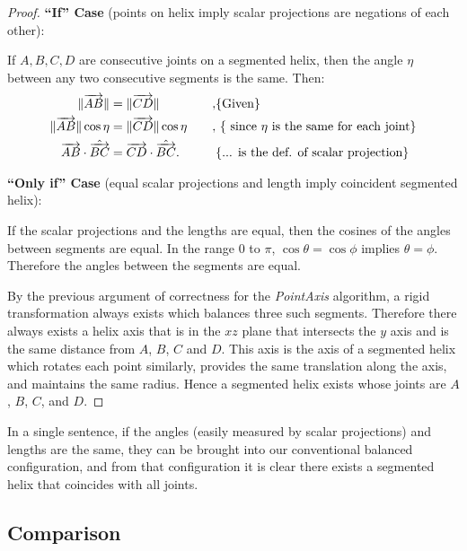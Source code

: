\documentclass[mathematics,article,submit,pdftex,moreauthors]{Definitions/mdpi}
\DeclarePairedDelimiter{\norm}{\lVert}{\rVert}
\begin{document}
\begin{proof}
  \textbf{``If'' Case} (points on helix imply scalar projections are negations of each other):

  If $A,B,C,D$ are consecutive joints on a segmented helix, then the angle $\eta$ between any two consecutive segments is the
  same. Then:
  \begin{alignat*}{2}
    \norm{\overrightarrow{AB}} &= \norm{\overrightarrow{CD}} &\quad,  &\text{\{Given\}}\\
    \norm{\overrightarrow{AB}}\cos{\eta} &= \norm{\overrightarrow{CD}}\cos{\eta} &\quad, &\text{ \{ since $\eta$ is the same for each joint\}} \\
    \overrightarrow{AB} \cdot \hat{\overrightarrow{BC}} &= \overrightarrow{CD} \cdot \hat{\overrightarrow{BC}}. &\quad &\text{\{... is the def. of scalar projection\}} \\
  \end{alignat*}

  \textbf{``Only if'' Case} (equal scalar projections and length imply coincident segmented helix):

  If the scalar projections and the lengths are equal, then the cosines of the angles between segments are equal.
  In the range $0$ to $\pi$,
  $\cos{\theta} = \cos{\phi}$ implies $\theta = \phi$. Therefore the angles between the segments are equal.

  By the previous argument of correctness for the {\em PointAxis} algorithm, a rigid transformation always exists
  which balances three such segments. Therefore there always exists a helix axis that
  is in the $xz$ plane that intersects the $y$ axis and is the same distance from $A$, $B$, $C$ and $D$.
  This axis is the axis of a segmented helix which rotates each point similarly, provides the same translation along the axis,
  and maintains the same radius. Hence a segmented helix exists whose joints are $A$, $B$, $C$, and $D$.
\end{proof}

In a single sentence, if the angles (easily measured by scalar projections) and lengths are the same,
they can be brought into our conventional balanced configuration,
and from that configuration it is clear there exists a segmented helix that coincides with all joints.

\subsection{Comparison}
\end{document}
